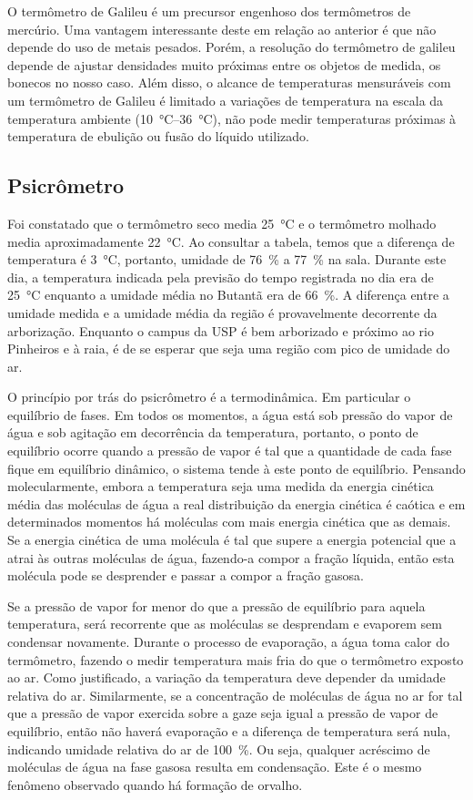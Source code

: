 O termômetro de Galileu é um precursor engenhoso dos termômetros de mercúrio. Uma vantagem interessante deste em relação ao anterior é que não depende do uso de metais pesados. Porém, a resolução do termômetro de galileu depende de ajustar densidades muito próximas entre os objetos de medida, os bonecos no nosso caso. Além disso, o alcance de temperaturas mensuráveis com um termômetro de Galileu é limitado a variações de temperatura na escala da temperatura ambiente (\qty{10}{\celsius}--\qty{36}{\celsius}), não pode medir temperaturas próximas à temperatura de ebulição ou fusão do líquido utilizado. 

\subsection{Psicrômetro}
Foi constatado que o termômetro seco media \qty{25}{\celsius} e o termômetro molhado media aproximadamente \qty{22}{\celsius}. Ao consultar a tabela, temos que a diferença de temperatura é \qty{3}{\celsius}, portanto, umidade de \qty{76}{\percent} a \qty{77}{\percent} na sala. Durante este dia, a temperatura indicada pela previsão do tempo registrada no dia era de \qty{25}{\celsius} enquanto a umidade média no Butantã era de \qty{66}{\percent}. A diferença entre a umidade medida e a umidade média da região é provavelmente decorrente da arborização. Enquanto o campus da USP é bem arborizado e próximo ao rio Pinheiros e à raia, é de se esperar que seja uma região com pico de umidade do ar. 

O princípio por trás do psicrômetro é a termodinâmica. Em particular o equilíbrio de fases. Em todos os momentos, a água está sob pressão do vapor de água e sob agitação em decorrência da temperatura, portanto, o ponto de equilíbrio ocorre quando a pressão de vapor é tal que a quantidade de cada fase fique em equilíbrio dinâmico, o sistema tende à este ponto de equilíbrio. Pensando molecularmente, embora a temperatura seja uma medida da energia cinética média das moléculas de água a real distribuição da energia cinética é caótica e em determinados momentos há moléculas com mais energia cinética que as demais. Se a energia cinética de uma molécula é tal que supere a energia potencial que a atrai às outras moléculas de água, fazendo-a compor a fração líquida, então esta molécula pode se desprender e passar a compor a fração gasosa. 

Se a pressão de vapor for menor do que a pressão de equilíbrio para aquela temperatura, será recorrente que as moléculas se desprendam e evaporem sem condensar novamente. Durante o processo de evaporação, a água toma calor do termômetro, fazendo o medir temperatura mais fria do que o termômetro exposto ao ar. Como justificado, a variação da temperatura deve depender da umidade relativa do ar. Similarmente, se a concentração de moléculas de água no ar for tal que a pressão de vapor exercida sobre a gaze seja igual a pressão de vapor de equilíbrio, então não haverá evaporação e a diferença de temperatura será nula, indicando umidade relativa do ar de \qty{100}{\percent}. Ou seja, qualquer acréscimo de moléculas de água na fase gasosa resulta em condensação. Este é o mesmo fenômeno observado quando há formação de orvalho.


